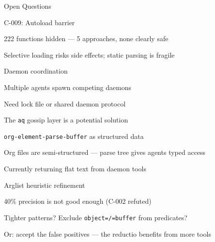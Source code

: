 \documentclass[presentation]{beamer}
\begin{document}
\begin{frame}[label={sec:orgf837567},fragile]{Open Questions}
 \begin{block}{C-009: Autoload barrier}
\begin{block}{222 functions hidden --- 5 approaches, none clearly safe}
\end{block}
\begin{block}{Selective loading risks side effects; static parsing is fragile}
\end{block}
\end{block}
\begin{block}{Daemon coordination}
\begin{block}{Multiple agents spawn competing daemons}
\end{block}
\begin{block}{Need lock file or shared daemon protocol}
\end{block}
\begin{block}{The \texttt{aq} gossip layer is a potential solution}
\end{block}
\end{block}
\begin{block}{\texttt{org-element-parse-buffer} as structured data}
\begin{block}{Org files are semi-structured --- parse tree gives agents typed access}
\end{block}
\begin{block}{Currently returning flat text from daemon tools}
\end{block}
\end{block}
\begin{block}{Arglist heuristic refinement}
\begin{block}{40\% precision is not good enough (C-002 refuted)}
\end{block}
\begin{block}{Tighter patterns? Exclude \texttt{object=/=buffer} from predicates?}
\end{block}
\begin{block}{Or: accept the false positives --- the reductio benefits from more tools}
\end{block}
\end{block}
\end{frame}
\end{document}
